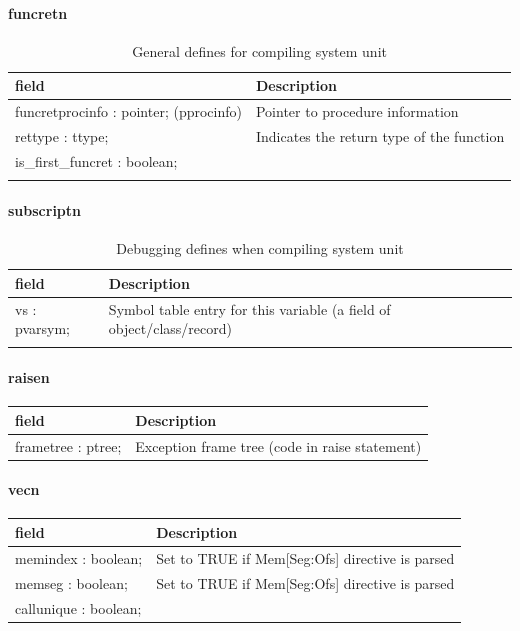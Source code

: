 \documentclass [12pt]{article}
\begin{document}
\paragraph{funcretn}\mbox{}

\begin{longtable}{|l|p{10cm}|}
\hline
field	& Description \\
\hline
\endhead
\hline
\endfoot
\textsf{funcretprocinfo : pointer; (pprocinfo)}& 
Pointer to procedure information  \\
\textsf{rettype : ttype;}& Indicates the return type of the function \\
\textsf{is{\_}first{\_}funcret : boolean;}&  \\
\hline
\caption{General defines for compiling system unit}
\label{tab18}
\end{longtable}

\paragraph{subscriptn}\mbox{}

\begin{longtable}{|l|p{10cm}|}
\hline
field	& Description \\
\hline
\endhead
\hline
\endfoot
\textsf{vs : pvarsym;}& 
Symbol table entry for this variable (a field of object/class/record) \\
\hline
\caption{Debugging defines when compiling system unit}
\end{longtable}

\paragraph{raisen}\mbox{}

\begin{longtable}{|l|p{10cm}|}
\hline
field	& Description \\
\hline
\endhead
\hline
\endfoot
\textsf{frametree : ptree;}& Exception frame tree (code in raise statement) 
\end{longtable}

\paragraph{vecn}\mbox{}

\begin{longtable}{|l|p{10cm}|}
\hline
field	& Description \\
\hline
\endhead
\hline
\endfoot
\textsf{memindex : boolean;} & Set to TRUE if Mem[Seg:Ofs] directive is parsed \\
\textsf{memseg : boolean;}   & Set to TRUE if Mem[Seg:Ofs] directive is parsed \\
\textsf{callunique : boolean;}& 
\label{tab21}
\end{longtable}
\end{document}
